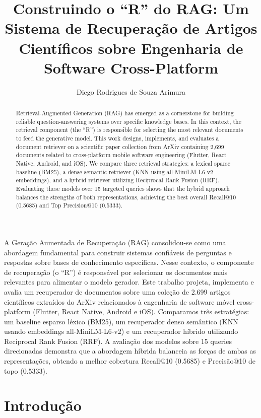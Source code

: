 \documentclass[12pt]{article}
\title{Construindo o ``R'' do RAG: Um Sistema de Recuperação de Artigos Científicos sobre Engenharia de Software Cross-Platform}
\author{Diego Rodrigues de Souza Arimura\inst{1} }
\begin{document}
 

\maketitle

\begin{abstract}
  Retrieval-Augmented Generation (RAG) has emerged as a cornerstone for building reliable question-answering systems over specific knowledge bases. In this context, the retrieval component (the ``R'') is responsible for selecting the most relevant documents to feed the generative model. This work designs, implements, and evaluates a document retriever on a scientific paper collection from ArXiv containing 2,699 documents related to cross-platform mobile software engineering (Flutter, React Native, Android, and iOS). We compare three retrieval strategies: a lexical sparse baseline (BM25), a dense semantic retriever (KNN using all-MiniLM-L6-v2 embeddings), and a hybrid retriever utilizing Reciprocal Rank Fusion (RRF). Evaluating these models over 15 targeted queries shows that the hybrid approach balances the strengths of both representations, achieving the best overall Recall@10 (0.5685) and Top Precision@10 (0.5333).
\end{abstract}
     
\begin{resumo} 
  A Geração Aumentada de Recuperação (RAG) consolidou-se como uma abordagem fundamental para construir sistemas confiáveis de perguntas e respostas sobre bases de conhecimento específicas. Nesse contexto, o componente de recuperação (o ``R'') é responsável por selecionar os documentos mais relevantes para alimentar o modelo gerador. Este trabalho projeta, implementa e avalia um recuperador de documentos sobre uma coleção de 2.699 artigos científicos extraídos do ArXiv relacionados à engenharia de software móvel cross-platform (Flutter, React Native, Android e iOS). Comparamos três estratégias: um baseline esparso léxico (BM25), um recuperador denso semântico (KNN usando embeddings all-MiniLM-L6-v2) e um recuperador híbrido utilizando Reciprocal Rank Fusion (RRF). A avaliação dos modelos sobre 15 queries direcionadas demonstra que a abordagem híbrida balanceia as forças de ambas as representações, obtendo a melhor cobertura Recall@10 (0.5685) e Precisão@10 de topo (0.5333).
\end{resumo}

\section{Introdução}
\end{document}
